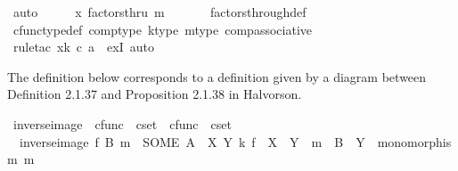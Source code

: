\begin{isabellebody}
\ auto\isanewline
\ \ \isamarkupfalse%
\ \isamarkupfalse%
\ {\isachardoublequoteopen}x\ factorsthru\ m\ {\isachardoublequoteclose}\isanewline
\ \ \ \ \isamarkupfalse%
\ factors{\isacharunderscore}{\kern0pt}through{\isacharunderscore}{\kern0pt}def\ \isanewline
\ \ \ \ \isamarkupfalse%
\ cfunc{\isacharunderscore}{\kern0pt}type{\isacharunderscore}{\kern0pt}def\ comp{\isacharunderscore}{\kern0pt}type\ k{\isacharunderscore}{\kern0pt}type\ m{\isacharunderscore}{\kern0pt}type\ comp{\isacharunderscore}{\kern0pt}associative\isanewline
\ \ \ \ \isamarkupfalse%
\ {\isacharparenleft}{\kern0pt}rule{\isacharunderscore}{\kern0pt}tac\ x{\isacharequal}{\kern0pt}{\isachardoublequoteopen}k\ {\isasymcirc}\isactrlsub c\ a{\isachardoublequoteclose}\ \ exI{\isacharcomma}{\kern0pt}\ auto{\isacharparenright}{\kern0pt}\isanewline
{}\isamarkupfalse%
%
\endisatagproof
{\isafoldproof}%
%
\isadelimproof
%
\endisadelimproof
%
\isadelimdocument
%
\endisadelimdocument
%
\isatagdocument
%
\isamarkuptrue%
%
\endisatagdocument
{\isafolddocument}%
%
\isadelimdocument
%
\endisadelimdocument
%
\begin{isamarkuptext}%
The definition below corresponds to a definition given by a diagram between Definition 2.1.37 and Proposition 2.1.38 in Halvorson.%
\end{isamarkuptext}\isamarkuptrue%
\isamarkupfalse%
\ inverse{\isacharunderscore}{\kern0pt}image\ {\isacharcolon}{\kern0pt}{\isacharcolon}{\kern0pt}\ {\isachardoublequoteopen}cfunc\ {\isasymRightarrow}\ cset\ {\isasymRightarrow}\ cfunc\ {\isasymRightarrow}\ cset{\isachardoublequoteclose}\ {\isacharparenleft}{\kern0pt}{\isachardoublequoteopen}{\isacharunderscore}{\kern0pt}\isactrlsup {\isacharminus}{\kern0pt}\isactrlbsub {\isacharunderscore}{\kern0pt}\isactrlesub {\isachardoublequoteclose}\ {\isacharbrackleft}{\kern0pt}{}{}{}{\isacharcomma}{\kern0pt}{}{\isacharcomma}{\kern0pt}{}{\isacharbrackright}{\kern0pt}{}{}{}{\isacharparenright}{\kern0pt}\ \isanewline
\ \ {\isachardoublequoteopen}inverse{\isacharunderscore}{\kern0pt}image\ f\ B\ m\ {\isacharequal}{\kern0pt}\ {\isacharparenleft}{\kern0pt}SOME\ A{\isachardot}{\kern0pt}\ {\isasymexists}\ X\ Y\ k{\isachardot}{\kern0pt}\ f\ {\isacharcolon}{\kern0pt}\ X\ {\isasymrightarrow}\ Y\ {\isasymand}\ m\ {\isacharcolon}{\kern0pt}\ B\ {\isasymrightarrow}\ Y\ {\isasymand}\ monomorphism\ m\ {\isasymand}\isanewline

\end{isabellebody}
